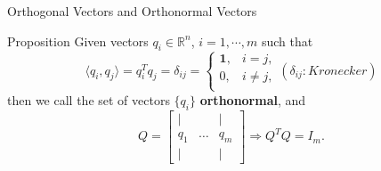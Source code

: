 \documentclass[aspectratio=169, UTF8]{ctexbeamer}
\begin{document}
\begin{frame}{Orthogonal Vectors and Orthonormal Vectors}
    \begin{block}{Proposition}
        Given vectors $q_i \in \mathbb{R}^n$, $i = 1,\cdots,m$ such that
        \begin{equation*}
            \langle q_i , q_j \rangle = q_i^T q_j = \delta_{ij} = \left\{ \begin{array}{ll}
                \mathbf{1}, & i = j,    \\
                0,          & i \neq j, \\
            \end{array} \right.
            (\delta_{ij} : Kronecker)
        \end{equation*}
        then we call the set of vectors $\{q_i\}$ \textbf{orthonormal}, and
        \begin{equation*}
            Q=\left[\begin{array}{ccc}
                    \mid  &        & \mid  \\
                    q_{1} & \ldots & q_{m} \\
                    \mid  &        & \mid
                \end{array}\right] \Rightarrow Q^TQ = I_{m}.
        \end{equation*}
    \end{block}

\end{frame}
\end{document}
